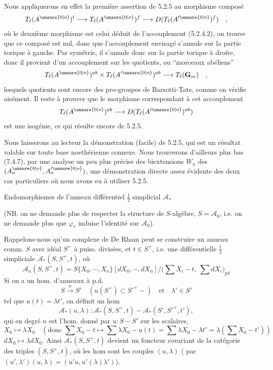 Nous appliquerons en effet la première assertion de 5.2.5 au morphisme composé
\[
T_\ell(A^{\unsure{0|o}})^t\longrightarrow T_\ell(A^{\unsure{0|o}})^f\longrightarrow D(T_\ell(A'^{\unsure{0|o}})^f)\quad ,
\]
où le deuxième morphisme est celui déduit de l'accouplement (5.2.4.2), on trouve que ce composé est nul, donc que l'accouplement envisagé s'annule sur la partie torique à gauche. Par symétrie, il s'annule donc sur la partie torique à droite, donc il provient d'un accouplement sur les quotients, ou ``morceaux abéliens''
\[
T_\ell(A^{\unsure{0|o}})^{ab}\times T_\ell(A'^{\unsure{0|o}})^{ab}\longrightarrow T_\ell(\mathbf G_m)\quad ,
\]
lesquels quotients sont encore des pro-groupes de Barsotti-Tate, comme on vérifie aisément. Il reste à prouver que le morphisme correspondant à cet accouplement
\[
T_\ell(A^{\unsure{0|o}})^{ab}\longrightarrow D(T_\ell(A'^{\unsure{0|o}})^{ab})
\]
est une isogénie, ce qui résulte encore de 5.2.5.

Nous laisserons au lecteur la démonstration (facile) de 5.2.5, qui est un résultat valable sur toute base noethérienne connexe. Nous trouverons d'ailleurs plus bas (7.4.7), par une analyse un peu plus précise des biextensions $W_n$ des $(A_n^{\unsure{0|o}},A_n'^{\unsure{0|o}})$, une démonstration directe assez évidente des deux cas particuliers où nous avons eu à utiliser 5.2.5.

Endomorphismes de l'anneau différentiel $\frac12$ simplicial $\mathcal A_*$

(NB. on ne demande plus de respecter la structure de $S$-algèbre, $S=\mathcal A_0$, i.e. on ne demande plus que $\varphi_*$ induise l'identité sur $\mathcal A_0$).

Rappelons-nous qu'un complexe de De Rham peut se construire  un anneau comm. $S$ avec idéal $S^+$ à puiss. divisées, et $t\in S^+$, i.e. une   différentielle  $\frac12$ simpliciale $\mathcal A_*(S,S^+,t)$, où
\[
\mathcal A_n(S,S^+,t)=S\{X_0,-,X_n\}[dX_0,-,dX_n]/\bigl(\sum X_i-t,\ \sum dX_i\bigr)_{pd}
\]
Si on a un hom. d'anneaux à p.d.
\[
S\xrightarrow{u}S'\quad(u(S^+)\subset S'^+-)\quad\text{et}\quad\lambda'\in S'
\]
tel que  $u(t)=\lambda t'$, on définit un hom 
\[
\mathcal A_*(u,\lambda):\mathcal A_*(S,S^+,t)-\mathcal A_*(S',S'^+,t'),
\]
qui en degré $n$ est l'hom.
donné par  $u:S-S'$ sur les scalaires,
\[
X_0\longmapsto\lambda X_0\quad\left(\text{donc }\sum X_0-t\longmapsto\sum\lambda X_0-u(t)=\sum\lambda X_0-\lambda t'=\lambda(\sum X_0-t')\right)
\]
$dX_0\longmapsto\lambda dX_0$. Ainsi $\mathcal A_*(S,S^+,t)$ devient un foncteur covariant de la catégorie des triples $(S,S^+,t)$, où les hom sont les couples $(u,\lambda)$  ( par $(u',\lambda')(u,\lambda)=(u'u,u'(\lambda)\lambda')$).

